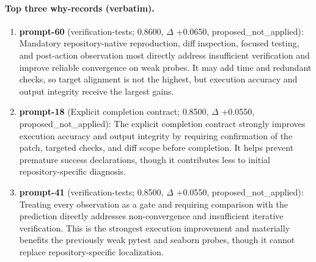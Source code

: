\paragraph{Top three why-records (verbatim).}\begin{enumerate}\itemsep1pt
\item \textbf{prompt-60} (verification-tests; 0.8600, $\Delta$ +0.0650, proposed\_not\_applied): Mandatory repository-native reproduction, diff inspection, focused testing, and post-action observation most directly address insufficient verification and improve reliable convergence on weak probes. It may add time and redundant checks, so target alignment is not the highest, but execution accuracy and output integrity receive the largest gains.
\item \textbf{prompt-18} (Explicit completion contract; 0.8500, $\Delta$ +0.0550, proposed\_not\_applied): The explicit completion contract strongly improves execution accuracy and output integrity by requiring confirmation of the patch, targeted checks, and diff scope before completion. It helps prevent premature success declarations, though it contributes less to initial repository-specific diagnosis.
\item \textbf{prompt-41} (verification-tests; 0.8500, $\Delta$ +0.0550, proposed\_not\_applied): Treating every observation as a gate and requiring comparison with the prediction directly addresses non-convergence and insufficient iterative verification. This is the strongest execution improvement and materially benefits the previously weak pytest and seaborn probes, though it cannot replace repository-specific localization.
\end{enumerate}
